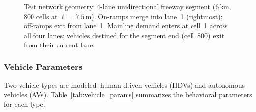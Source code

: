 \documentclass[review,authoryear]{elsarticle}
\begin{document}
\begin{figure}[ht]
    \caption{Test network geometry: 4-lane unidirectional freeway segment (6\,km, 800 cells at $\ell = 7.5$\,m). On-ramps merge into lane~1 (rightmost); off-ramps exit from lane~1. Mainline demand enters at cell~1 across all four lanes; vehicles destined for the segment end (cell~800) exit from their current lane.}
    \label{fig:network}
\end{figure}

\subsubsection{Vehicle Parameters}

Two vehicle types are modeled: human-driven vehicles (HDVs) and autonomous vehicles (AVs). Table~\ref{tab:vehicle_params} summarizes the behavioral parameters for each type.
\end{document}
